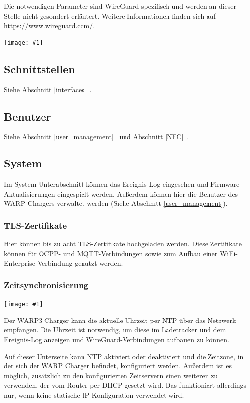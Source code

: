 \documentclass[a4paper,10pt]{article}
\newcommand{\gfx}[1]{\texttt{[image: \#1]}}
\newcommand*{\fullref}[1]{Abschnitt \hyperref[{#1}]{\ref*{#1}~\nameref*{#1}}}
\begin{document}
\begin{multicols*}{2}
    Die notwendigen Parameter sind WireGuard-spezifisch und werden an dieser Stelle
    nicht gesondert erläutert. Weitere Informationen finden sich auf\\
    \url{https://www.wireguard.com/}.

    \gfx{./img_warp3/resized/web_wireguard}

    \subsection{Schnittstellen}
    Siehe \fullref{interfaces}.

    \subsection{Benutzer}
    Siehe \fullref{user_management} und \fullref{NFC}.

    \subsection{System}
    Im System-Unterabschnitt können das Ereignis-Log eingesehen und
	Firmware-Aktualisierungen eingespielt werden.
    Außerdem können hier die Benutzer des WARP Chargers verwaltet werden (Siehe
    Abschnitt \ref{user_management}).

    \vspace{-0.2cm}
    \subsubsection{TLS-Zertifikate}\label{tls}
    Hier können bis zu acht TLS-Zertifikate hochgeladen werden. Diese Zertifikate können
    für OCPP- und MQTT-Verbindungen sowie zum Aufbau einer WiFi-Enterprise-Verbindung genutzt werden.

    \vspace{-0.2cm}
    \subsubsection{Zeitsynchronisierung}\label{ntp}

    \gfx{./img_warp3/resized/web_ntp}

    Der WARP3 Charger kann die aktuelle Uhrzeit per NTP über das Netzwerk empfangen.
    Die Uhrzeit ist notwendig, um diese im Ladetracker und dem Ereignis-Log anzeigen und
    WireGuard-Verbindungen aufbauen zu können.

    Auf dieser Unterseite kann NTP aktiviert oder deaktiviert und die Zeitzone, in der sich
    der WARP Charger befindet, konfiguriert werden. Außerdem ist es möglich, zusätzlich zu den konfigurierten Zeitservern einen weiteren zu verwenden, der vom Router per DHCP gesetzt wird. Das funktioniert allerdings nur, wenn keine statische IP-Konfiguration verwendet wird.


\end{multicols*}
\end{document}
